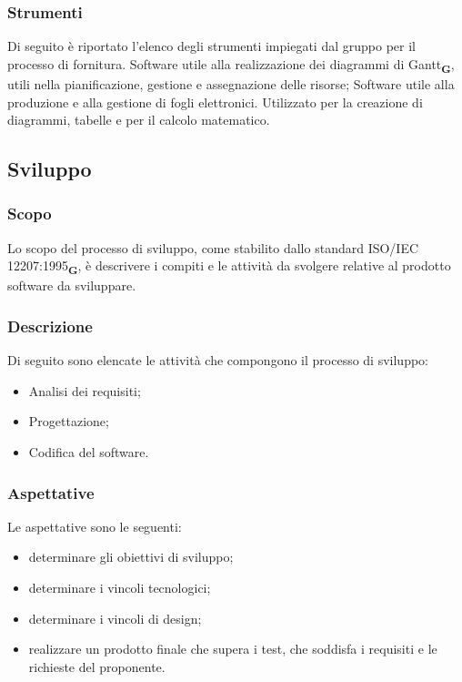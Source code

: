 \subsubsection{Strumenti}
Di seguito è riportato l'elenco degli strumenti impiegati dal gruppo per il processo di fornitura.
Software utile alla realizzazione dei diagrammi di Gantt\textsubscript{\textbf{G}}, utili nella pianificazione, gestione e assegnazione delle risorse;
Software utile alla produzione e alla gestione di fogli elettronici. Utilizzato per la creazione di diagrammi, tabelle e per il calcolo matematico.
\subsection{Sviluppo}
\subsubsection{Scopo}
Lo scopo del processo di sviluppo, come stabilito dallo standard ISO/IEC 12207:1995\textsubscript{\textbf{G}}, è descrivere i compiti e le attività da svolgere relative al prodotto software da sviluppare.
\subsubsection{Descrizione}
Di seguito sono elencate le attività che compongono il processo di sviluppo:
\begin{itemize}
    \item Analisi dei requisiti;
    \item Progettazione;
    \item Codifica del software.
\end{itemize}
\subsubsection{Aspettative}
Le aspettative sono le seguenti:
\begin{itemize}
    \item determinare gli obiettivi di sviluppo;
    \item determinare i vincoli tecnologici;
    \item determinare i vincoli di design;
    \item realizzare un prodotto finale che supera i test, che soddisfa i requisiti e le richieste del proponente.
\end{itemize}
